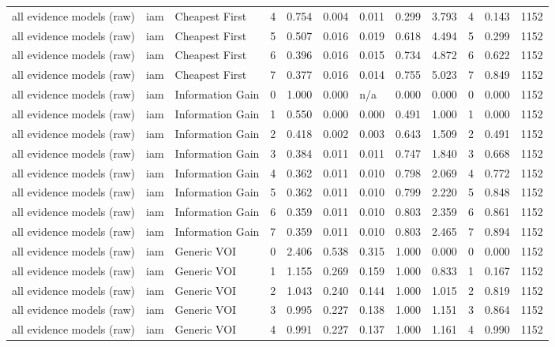 \begin{table}[!ht]
{\begin{tabular}{llllllllllll}
all evidence models (raw) & iam & Cheapest First & 4 & 0.754 & 0.004 & 0.011 & 0.299 & 3.793 & 4 & 0.143 & 1152 \\
all evidence models (raw) & iam & Cheapest First & 5 & 0.507 & 0.016 & 0.019 & 0.618 & 4.494 & 5 & 0.299 & 1152 \\
all evidence models (raw) & iam & Cheapest First & 6 & 0.396 & 0.016 & 0.015 & 0.734 & 4.872 & 6 & 0.622 & 1152 \\
all evidence models (raw) & iam & Cheapest First & 7 & 0.377 & 0.016 & 0.014 & 0.755 & 5.023 & 7 & 0.849 & 1152 \\
all evidence models (raw) & iam & Information Gain & 0 & 1.000 & 0.000 & n/a & 0.000 & 0.000 & 0 & 0.000 & 1152 \\
all evidence models (raw) & iam & Information Gain & 1 & 0.550 & 0.000 & 0.000 & 0.491 & 1.000 & 1 & 0.000 & 1152 \\
all evidence models (raw) & iam & Information Gain & 2 & 0.418 & 0.002 & 0.003 & 0.643 & 1.509 & 2 & 0.491 & 1152 \\
all evidence models (raw) & iam & Information Gain & 3 & 0.384 & 0.011 & 0.011 & 0.747 & 1.840 & 3 & 0.668 & 1152 \\
all evidence models (raw) & iam & Information Gain & 4 & 0.362 & 0.011 & 0.010 & 0.798 & 2.069 & 4 & 0.772 & 1152 \\
all evidence models (raw) & iam & Information Gain & 5 & 0.362 & 0.011 & 0.010 & 0.799 & 2.220 & 5 & 0.848 & 1152 \\
all evidence models (raw) & iam & Information Gain & 6 & 0.359 & 0.011 & 0.010 & 0.803 & 2.359 & 6 & 0.861 & 1152 \\
all evidence models (raw) & iam & Information Gain & 7 & 0.359 & 0.011 & 0.010 & 0.803 & 2.465 & 7 & 0.894 & 1152 \\
all evidence models (raw) & iam & Generic VOI & 0 & 2.406 & 0.538 & 0.315 & 1.000 & 0.000 & 0 & 0.000 & 1152 \\
all evidence models (raw) & iam & Generic VOI & 1 & 1.155 & 0.269 & 0.159 & 1.000 & 0.833 & 1 & 0.167 & 1152 \\
all evidence models (raw) & iam & Generic VOI & 2 & 1.043 & 0.240 & 0.144 & 1.000 & 1.015 & 2 & 0.819 & 1152 \\
all evidence models (raw) & iam & Generic VOI & 3 & 0.995 & 0.227 & 0.138 & 1.000 & 1.151 & 3 & 0.864 & 1152 \\
all evidence models (raw) & iam & Generic VOI & 4 & 0.991 & 0.227 & 0.137 & 1.000 & 1.161 & 4 & 0.990 & 1152 \\

\end{tabular}}
\end{table}

